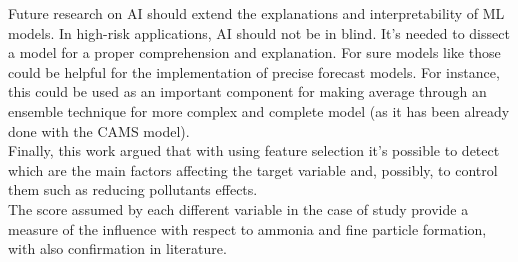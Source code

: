 Future research on AI should extend the explanations and interpretability of ML models.
In high-risk applications, AI should not be in blind. 
It's needed to dissect a model for a proper comprehension and explanation.
For sure models like those could be helpful for the implementation of precise forecast models.  
For instance, this could be used as an important component for making average through an ensemble technique for more complex and complete model (as it has been already done with the CAMS model).
\\
Finally, this work argued that with using feature selection it's possible to detect which are the main factors affecting the target variable and, possibly, to control them such as reducing pollutants effects.\\
The score assumed by each different variable in the case of study provide a measure of the influence with respect to ammonia and fine particle formation, with also confirmation in literature.
\begin{comment}
Looking forward, further attempts for reducing pollutant formation should be made by procedures actually used.
\end{comment}
